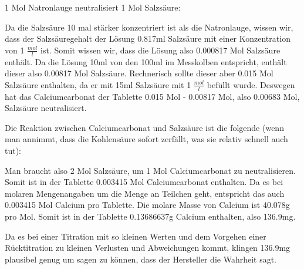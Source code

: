 \documentclass[8pt, letterpaper]{article}
\newcommand{\mpl}[1]{#1 \(\frac{mol}{l}\)}
\begin{document}
1 Mol Natronlauge neutralisiert 1 Mol Salzsäure:
\begin{center}
\end{center}

Da die Salzsäure 10 mal stärker konzentriert ist als die Natronlauge, wissen wir, dass der Salzsäuregehalt der Lösung 0.817ml Salzsäure mit einer Konzentration von \mpl{1} ist.
Somit wissen wir, dass die Lösung also 0.000817 Mol Salzsäure enthält. Da die Lösung 10ml von den 100ml im Messkolben entspricht, enthält dieser also 0.00817 Mol Salzsäure.
Rechnerisch sollte dieser aber 0.015 Mol Salzsäure enthalten, da er mit 15ml Salzsäure mit \mpl{1} befüllt wurde. Deswegen hat das Calciumcarbonat der Tablette 0.015 Mol - 0.00817 Mol, also 0.00683 Mol, Salzsäure neutralisiert.

Die Reaktion zwischen Calciumcarbonat und Salzsäure ist die folgende (wenn man annimmt, dass die Kohlensäure sofort zerfällt, was sie relativ schnell auch tut):
\begin{center}
\end{center}

Man braucht also 2 Mol Salzsäure, um 1 Mol Calciumcarbonat zu neutralisieren. Somit ist in der Tablette 0.003415 Mol Calciumcarbonat enthalten.
Da es bei molaren Mengenangaben um die Menge an Teilchen geht, entspricht das auch 0.003415 Mol Calcium pro Tablette.
Die molare Masse von Calcium ist 40.078g pro Mol.
Somit ist in der Tablette 0.13686637g Calcium enthalten, also 136.9mg.

Da es bei einer Titration mit so kleinen Werten und dem Vorgehen einer Rücktitration zu kleinen Verlusten und Abweichungen kommt, klingen 136.9mg plausibel genug um sagen zu können, dass der Hersteller die Wahrheit sagt.
\end{document}
